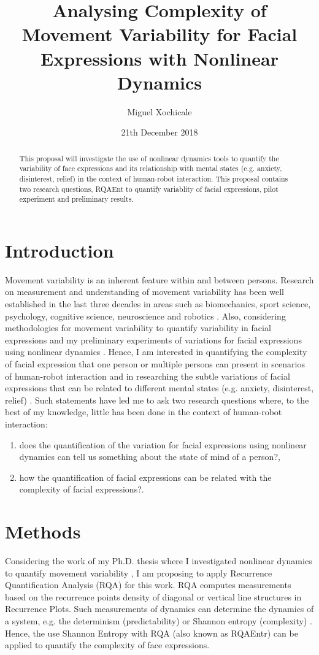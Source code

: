 \documentclass[12pt]{article}
\title{Analysing Complexity of Movement Variability 
for Facial Expressions with Nonlinear Dynamics}
\author{Miguel Xochicale\\ 
}
\date{21th December 2018}
\begin{document}
\maketitle


\begin{abstract}
This proposal will investigate the use of nonlinear dynamics tools
to quantify the variability of face expressions and its relationship
with mental states (e.g. anxiety, disinterest, relief) in the context
of human-robot interaction. This proposal contains two research questions,
RQAEnt to quantify variablity of facial expressions, pilot experiment and 
preliminary results.
\end{abstract}


\section{Introduction}
Movement variability is an inherent feature within and between persons. 
Research on measurement and understanding of movement variability has been 
well established in the last three decades in areas such as biomechanics, 
sport science, psychology, cognitive science, neuroscience and robotics 
\cite{2018arXiv181009249X}.
Also, considering methodologies for movement variability 
to quantify variability in facial expressions and 
my preliminary experiments of variations 
for facial expressions using nonlinear dynamics \cite{MPXochicale_CERE2018}.
Hence, I am interested in quantifying the complexity 
of facial expression that one person or multiple persons can present in scenarios 
of human-robot interaction and  in researching 
the subtle variations of facial expressions that can be related to different 
mental states  (e.g. anxiety, disinterest, relief) \cite{back2014}.
Such statements have led me to ask two research questions where, 
to the best of my knowledge, little has been done in the context of 
human-robot interaction:
\begin{enumerate}[label=(\roman*)]
 \item does the quantification of the variation for facial expressions 
using nonlinear dynamics can tell us something about the state of mind of a person?, 
\item how the quantification of facial expressions can be related with 
the complexity of facial expressions?.
\end{enumerate}

\section{Methods}
Considering the work of my Ph.D. thesis where I investigated nonlinear dynamics
to quantify movement variability \cite{XochicalePhDThesis2018},
I am proposing to apply Recurrence Quantification Analysis (RQA) for this work.
RQA computes measurements based on the recurrence points density of diagonal 
or vertical line structures in Recurrence Plots. 
Such measurements of dynamics can determine the dynamics of a system,
e.g. the determinism (predictability) or Shannon entropy (complexity) 
\cite{marwan2007}. 
Hence, the use Shannon Entropy with RQA (also known as RQAEntr)
can be applied to quantify the complexity of face expressions. 
\end{document}
